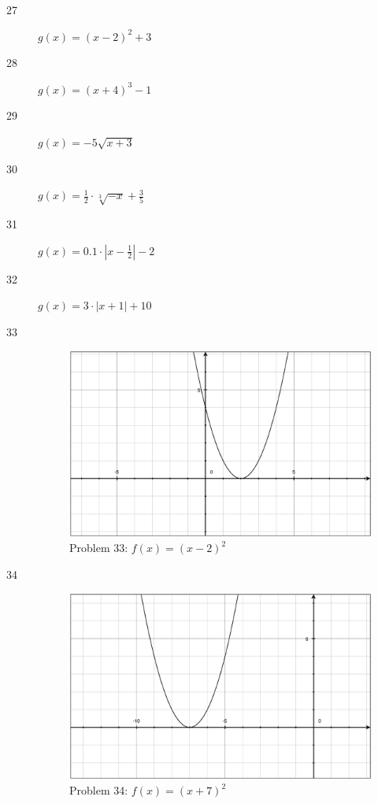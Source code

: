 \documentclass{exam}
\begin{document}
\begin{description}
    \item[27] $g(x) = (x - 2)^2 + 3$

    \item[28] $g(x) = (x + 4)^3 - 1$
      
    \item[29] $g(x) = -5 \sqrt{x + 3}$
      
    \item[30] $g(x) = \frac{1}{2} \cdot \sqrt[3]{-x} + \frac{3}{5}$

    \item[31] $g(x) = 0.1 \cdot \left| x - \frac{1}{2} \right| - 2$
      
    \item[32] $g(x) = 3 \cdot |x + 1| + 10$
      
    \item[33]
      \begin{figure}[H]
        \centering
        \includegraphics[scale=.3]{problem_33.eps}
        \caption*{Problem 33: $f(x) = (x - 2)^2$}
      \end{figure}

    \item[34]
      \begin{figure}[H]
        \centering
        \includegraphics[scale=.3]{problem_34.eps}
        \caption*{Problem 34: $f(x) = (x + 7)^2$}
      \end{figure}


\end{description}
\end{document}
